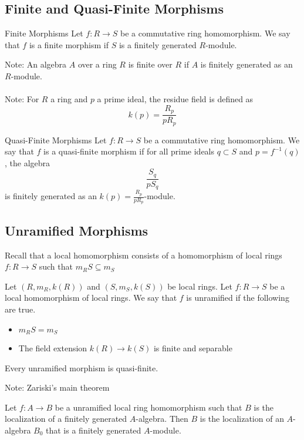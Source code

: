 \documentclass[a4paper]{article}
\begin{document}
\subsection{Finite and Quasi-Finite Morphisms}
\begin{defn}{Finite Morphisms}{} Let $f:R\to S$ be a commutative ring homomorphism. We say that $f$ is a finite morphism if $S$ is a finitely generated $R$-module. 
\end{defn}

Note: An algebra $A$ over a ring $R$ is finite over $R$ if $A$ is finitely generated as an $R$-module. \\~\\

Note: For $R$ a ring and $p$ a prime ideal, the residue field is defined as $$k(p)=\frac{R_p}{pR_p}$$

\begin{defn}{Quasi-Finite Morphisms}{} Let $f:R\to S$ be a commutative ring homomorphism. We say that $f$ is a quasi-finite morphism if for all prime ideals $q\subset S$ and $p=f^{-1}(q)$, the algebra $$\frac{S_q}{pS_q}$$ is finitely generated as an $k(p)=\frac{R_p}{pR_p}$-module. 
\end{defn}

\subsection{Unramified Morphisms}
Recall that a local homomorphism consists of a homomorphism of local rings $f:R\to S$ such that $m_RS\subseteq m_S$

\begin{defn}{}{} Let $(R,m_R,k(R))$ and $(S,m_S,k(S))$ be local rings. Let $f:R\to S$ be a local homomorphism of local rings. We say that $f$ is unramified if the following are true. 
\begin{itemize}
\item $m_RS=m_S$
\item The field extension $k(R)\to k(S)$ is finite and separable
\end{itemize}
\end{defn}

\begin{lmm}{}{} Every unramified morphism is quasi-finite. 
\end{lmm}

Note: Zariski's main theorem

\begin{prp}{}{} Let $f:A\to B$ be a unramified local ring homomorphism such that $B$ is the localization of a finitely generated $A$-algebra. Then $B$ is the localization of an $A$-algebra $B_0$ that is a finitely generated $A$-module. 
\end{prp}
\end{document}
